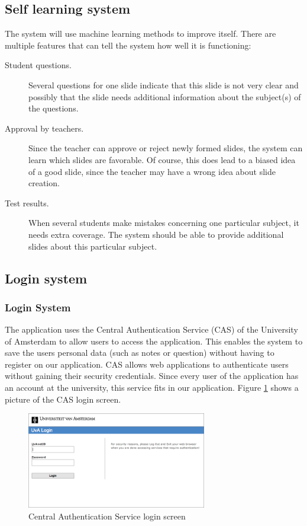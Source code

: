 \documentclass[11pt]{article}
\begin{document}
\subsection{Self learning system}
The system will use machine learning methods to improve itself. There are multiple features that can tell the system how well it is functioning:
\begin{description}
\item[Student questions.] Several questions for one slide indicate that this slide is not very clear and possibly that the slide needs additional information about the subject(s) of the questions. 
\item[Approval by teachers.] Since the teacher can approve or reject newly formed slides, the system can learn which slides are favorable. Of course, this does lead to a biased idea of a good slide, since the teacher may have a wrong idea about slide creation. 
\item[Test results.] When several students make mistakes concerning one particular subject, it needs extra coverage. The system should be able to provide additional slides about this particular subject.
\end{description}

\subsection{Login system}
\subsubsection{Login System}
The application uses the Central Authentication Service (CAS) of the University of Amsterdam to allow users to access the application. This enables the system to save the users personal data (such as notes or question) without having to register on our application. CAS allows web applications to authenticate users without gaining their security credentials. Since every user of the application has an account at the university, this service fits in our application. Figure \ref{CAS} shows a picture of the CAS login screen.
\begin{figure}[!h]
\centering
\includegraphics[width=0.7\textwidth]{Cas.png}
\caption{Central Authentication Service login screen}
\label{CAS}
\end{figure}
\end{document}
